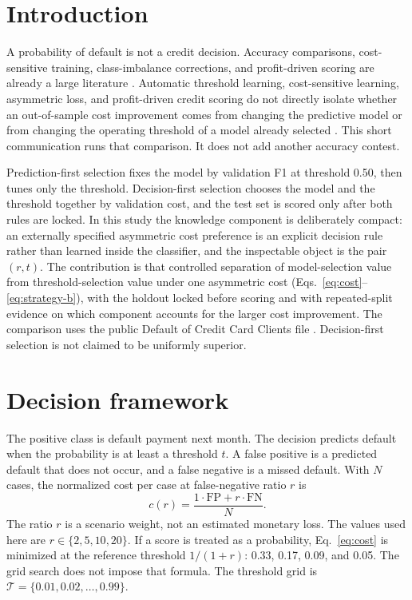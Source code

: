 \documentclass[12pt]{article}
\begin{document}
\section{Introduction}
A probability of default is not a credit decision. Accuracy comparisons, cost-sensitive training, class-imbalance corrections, and profit-driven scoring are already a large literature \cite{idbenjra2024,li2024,kopanja2025,xing2024,shen2024,crella2025,wangchi2024,zhao2024,xukou2025,xuergu2026,tang2024,mushava2024,weng2025,nazri2025,sun2024,ranjan2024,chen2024,tu2025,kwon2025,yang2024,chang2024,ding2025,wang2025ejor,vikas2025}. Automatic threshold learning, cost-sensitive learning, asymmetric loss, and profit-driven credit scoring do not directly isolate whether an out-of-sample cost improvement comes from changing the predictive model or from changing the operating threshold of a model already selected \cite{li2024,xing2024,shen2024,crella2025,wangchi2024,zhao2024,xukou2025,xuergu2026}. This short communication runs that comparison. It does not add another accuracy contest.

Prediction-first selection fixes the model by validation F1 at threshold 0.50, then tunes only the threshold. Decision-first selection chooses the model and the threshold together by validation cost, and the test set is scored only after both rules are locked. In this study the knowledge component is deliberately compact: an externally specified asymmetric cost preference is an explicit decision rule rather than learned inside the classifier, and the inspectable object is the pair \((r,t)\). The contribution is that controlled separation of model-selection value from threshold-selection value under one asymmetric cost (Eqs.~\eqref{eq:cost}--\eqref{eq:strategy-b}), with the holdout locked before scoring and with repeated-split evidence on which component accounts for the larger cost improvement. The comparison uses the public Default of Credit Card Clients file \cite{yeh2009,yehdata}. Decision-first selection is not claimed to be uniformly superior.

\section{Decision framework}
\label{sec:framework}
The positive class is default payment next month. The decision predicts default when the probability is at least a threshold \(t\). A false positive is a predicted default that does not occur, and a false negative is a missed default. With \(N\) cases, the normalized cost per case at false-negative ratio \(r\) is
\begin{equation}
c(r)=\frac{1\cdot\mathrm{FP}+r\cdot\mathrm{FN}}{N}.
\label{eq:cost}
\end{equation}
The ratio \(r\) is a scenario weight, not an estimated monetary loss. The values used here are \(r\in\{2,5,10,20\}\). If a score is treated as a probability, Eq.~\eqref{eq:cost} is minimized at the reference threshold \(1/(1+r)\): 0.33, 0.17, 0.09, and 0.05. The grid search does not impose that formula. The threshold grid is \(\mathcal{T}=\{0.01,0.02,\ldots,0.99\}\).
\end{document}
